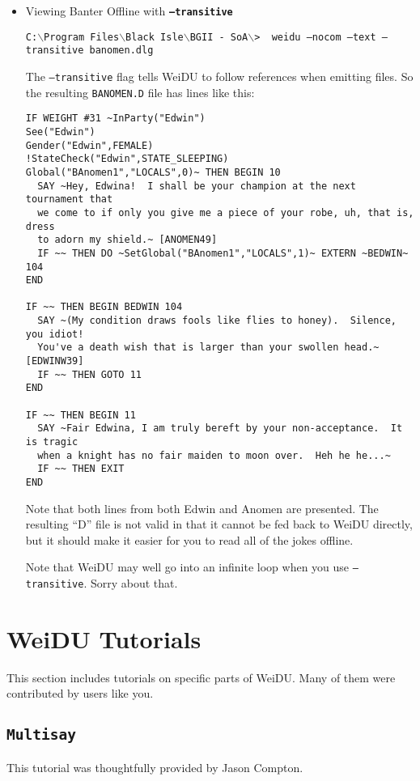 \documentclass{article}
\def\ttref#1{\ahrefloc{#1}{\tt #1}}
\def\DEFSYN#1{{\tt \bf #1}\index{#1}}
\def\t#1{{\tt #1}}
\def\CMD#1{{\tt {C:$\backslash$Program Files$\backslash$Black Isle$\backslash$BGII - SoA$\backslash$>} \color{red} \t{#1} }}
\begin{document}
\begin{itemize}
\item Viewing Banter Offline with \DEFSYN{--transitive}

\CMD{ weidu --nocom --text --transitive banomen.dlg }

The \t{--transitive} flag tells WeiDU to follow \ttref{EXTERN}
references when emitting \ttref{D} files. So the resulting \t{BANOMEN.D}
file has lines like this:

\begin{verbatim}
IF WEIGHT #31 ~InParty("Edwin")
See("Edwin")
Gender("Edwin",FEMALE)
!StateCheck("Edwin",STATE_SLEEPING)
Global("BAnomen1","LOCALS",0)~ THEN BEGIN 10
  SAY ~Hey, Edwina!  I shall be your champion at the next tournament that
  we come to if only you give me a piece of your robe, uh, that is, dress
  to adorn my shield.~ [ANOMEN49] 
  IF ~~ THEN DO ~SetGlobal("BAnomen1","LOCALS",1)~ EXTERN ~BEDWIN~ 104
END

IF ~~ THEN BEGIN BEDWIN 104
  SAY ~(My condition draws fools like flies to honey).  Silence, you idiot!
  You've a death wish that is larger than your swollen head.~ [EDWINW39]
  IF ~~ THEN GOTO 11
END

IF ~~ THEN BEGIN 11
  SAY ~Fair Edwina, I am truly bereft by your non-acceptance.  It is tragic
  when a knight has no fair maiden to moon over.  Heh he he...~
  IF ~~ THEN EXIT
END
\end{verbatim}

Note that both lines from both Edwin and Anomen are presented. The
resulting ``D'' file is not valid in that it cannot be fed back to WeiDU
directly, but it should make it easier for you to read all of the jokes
offline. 

Note that WeiDU may well go into an infinite loop when you use
\t{--transitive}. Sorry about that. 

\end{itemize}

\section{WeiDU Tutorials}

This section includes tutorials on specific parts of WeiDU. Many of them
were contributed by users like you. 

\subsection{\t{Multisay}}
\label{Multisay}
This tutorial was thoughtfully provided by Jason Compton. 
\end{document}

